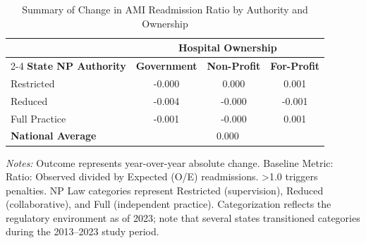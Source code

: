 \begin{table}[htbp]
    \centering
    \caption{Summary of Change in AMI Readmission Ratio by Authority and Ownership}
    \label{tab:d_rrp_excess_ratio_ami}
    \vspace{0.2cm}
    \begin{tabular}{lccc}
        \toprule
        & \multicolumn{3}{c}{\textbf{Hospital Ownership}} \\
        \cmidrule(lr){2-4}
        \textbf{State NP Authority} & \textbf{Government} & \textbf{Non-Profit} & \textbf{For-Profit} \\
        \midrule
        Restricted & -0.000 & 0.000 & 0.001 \\
        Reduced & -0.004 & -0.000 & -0.001 \\
        Full Practice & -0.001 & -0.000 & 0.001 \\
        \midrule
        \textbf{National Average} & \multicolumn{3}{c}{0.000} \\
        \bottomrule
    \end{tabular}
    \vspace{0.1cm}
    \begin{minipage}{0.85\textwidth}
        \footnotesize \textit{Notes:} Outcome represents year-over-year absolute change. Baseline Metric: Ratio: Observed divided by Expected (O/E) readmissions. >1.0 triggers penalties. NP Law categories represent Restricted (supervision), Reduced (collaborative), and Full (independent practice). Categorization reflects the regulatory environment as of 2023; note that several states transitioned categories during the 2013--2023 study period.
    \end{minipage}
\end{table}